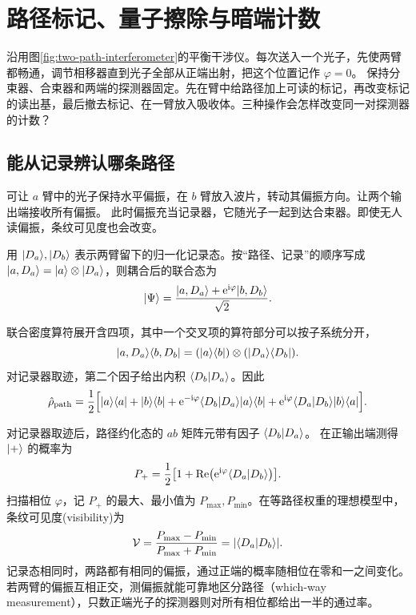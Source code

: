\section{路径标记、量子擦除与暗端计数}
\label{sec:qm-path-readout}
沿用图\ref{fig:two-path-interferometer}的平衡干涉仪。每次送入一个光子，先使两臂都畅通，调节相移器直到光子全部从正端出射，把这个位置记作 $\varphi = 0$。
保持分束器、合束器和两端的探测器固定。先在臂中给路径加上可读的标记，再改变标记的读出基，最后撤去标记、在一臂放入吸收体。三种操作会怎样改变同一对探测器的计数？

\subsection{能从记录辨认哪条路径}
\label{ss:qm-path-marking}
可让 $a$ 臂中的光子保持水平偏振，在 $b$ 臂放入波片，转动其偏振方向。让两个输出端接收所有偏振。
此时偏振充当记录器，它随光子一起到达合束器。即使无人读偏振，条纹可见度也会改变。

用 $\lvert D_a\rangle,\lvert D_b\rangle$ 表示两臂留下的归一化记录态。按“路径、记录”的顺序写成 $\lvert a,D_a\rangle = \lvert a\rangle \otimes \lvert D_a\rangle$，则耦合后的联合态为
\begin{equation}
    \lvert\Psi\rangle = \frac{\lvert a,D_a\rangle + \mathop{}\!\mathrm{e}^{\mathrm{i}\varphi}\lvert b,D_b\rangle}{\sqrt2}.
\end{equation}

联合密度算符展开含四项，其中一个交叉项的算符部分可以按子系统分开，
\[
    \lvert a,D_a\rangle\langle b,D_b\rvert = (\lvert a\rangle\langle b\rvert) \otimes (\lvert D_a\rangle\langle D_b\rvert).
\]
对记录器取迹，第二个因子给出内积 $\langle D_b\vert D_a\rangle$。因此
\begin{equation}
    \hat{\rho}_{\mathrm{path}} = \frac12\Bigl[
        \lvert a\rangle\langle a\rvert + \lvert b\rangle\langle b\rvert
        + \mathop{}\!\mathrm{e}^{-\mathrm{i}\varphi}\langle D_b\vert D_a\rangle\lvert a\rangle\langle b\rvert
        + \mathop{}\!\mathrm{e}^{\mathrm{i}\varphi}\langle D_a\vert D_b\rangle\lvert b\rangle\langle a\rvert\Bigr].
\end{equation}

对记录器取迹后，路径约化态的 $ab$ 矩阵元带有因子 $\langle D_b\vert D_a\rangle$。
在正输出端测得 $\lvert+\rangle$ 的概率为
\begin{equation}
    P_+ = \frac12\bigl[1 + \operatorname{Re}\bigl(\mathop{}\!\mathrm{e}^{\mathrm{i}\varphi}\langle D_a\vert D_b\rangle\bigr)\bigr].
\end{equation}
扫描相位 $\varphi$，记 $P_+$ 的最大、最小值为 $P_{\max},P_{\min}$。在等路径权重的理想模型中，条纹可见度(visibility)为
\begin{equation}
    \mathcal V = \frac{P_{\max} - P_{\min}}{P_{\max} + P_{\min}}
              = \lvert\langle D_a\vert D_b\rangle\rvert .
\end{equation}
记录态相同时，两路都有相同的偏振，通过正端的概率随相位在零和一之间变化。若两臂的偏振互相正交，测偏振就能可靠地区分路径（which-way measurement），只数正端光子的探测器则对所有相位都给出一半的通过率。

